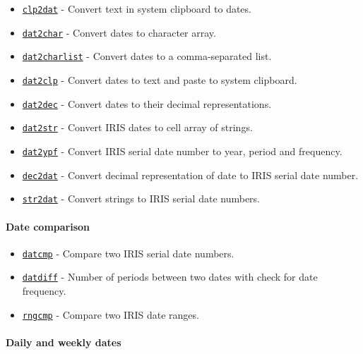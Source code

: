 \begin{itemize}
\itemsep1pt\parskip0pt
\item
  \href{dates/clp2dat}{\texttt{clp2dat}} - Convert text in system
  clipboard to dates.
\item
  \href{dates/dat2char}{\texttt{dat2char}} - Convert dates to character
  array.
\item
  \href{dates/dat2charlist}{\texttt{dat2charlist}} - Convert dates to a
  comma-separated list.
\item
  \href{dates/dat2clp}{\texttt{dat2clp}} - Convert dates to text and
  paste to system clipboard.
\item
  \href{dates/dat2dec}{\texttt{dat2dec}} - Convert dates to their
  decimal representations.
\item
  \href{dates/dat2str}{\texttt{dat2str}} - Convert IRIS dates to cell
  array of strings.
\item
  \href{dates/dat2ypf}{\texttt{dat2ypf}} - Convert IRIS serial date
  number to year, period and frequency.
\item
  \href{dates/dec2dat}{\texttt{dec2dat}} - Convert decimal
  representation of date to IRIS serial date number.
\item
  \href{dates/str2dat}{\texttt{str2dat}} - Convert strings to IRIS
  serial date numbers.
\end{itemize}

\paragraph{Date comparison}\label{date-comparison}

\begin{itemize}
\itemsep1pt\parskip0pt
\item
  \href{dates/datcmp}{\texttt{datcmp}} - Compare two IRIS serial date
  numbers.
\item
  \href{dates/datdiff}{\texttt{datdiff}} - Number of periods between two
  dates with check for date frequency.
\item
  \href{dates/rngcmp}{\texttt{rngcmp}} - Compare two IRIS date ranges.
\end{itemize}

\paragraph{Daily and weekly dates}\label{daily-and-weekly-dates}

